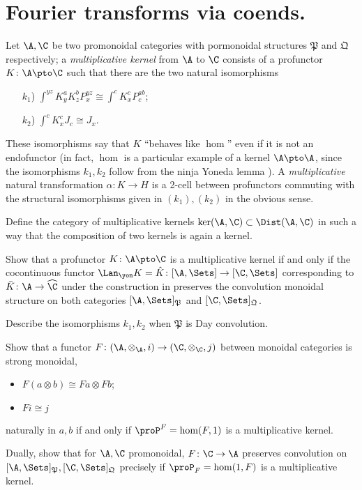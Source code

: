 \section{Fourier transforms via coends.}
\begin{definition}
Let $\A ,\C$ be two promonoidal categories with pormonoidal structures $\mathfrak{P}$ and $\mathfrak{Q}$ respectively; a \emph{multiplicative kernel} from $\A$ to $\C$ consists of a profunctor $K\colon \A\pto \C$ such that there are the two natural isomorphisms
\begin{itemize}
\item[$k_1$)] $\int^{yz}K^a_y K^b_z P^{yz}_x\cong \int^c K^c_x P^{ab}_c$;
\item[$k_2$)] $\int^c K^c_x J_c\cong J_x$.
\end{itemize}
These isomorphisms say that $K$ ``behaves like $\hom$'' even if it is not an endofunctor (in fact, $\hom$ is a particular example of a kernel $\A\pto \A$, since the isomorphisms $k_1, k_2$ follow from the ninja Yoneda lemma ).
A \emph{multiplicative} natural transformation $\alpha\colon K\to H$ is a 2-cell between profunctors commuting with the structural isomorphisms given in $(k_1), (k_2)$ in the obvious sense.
\end{definition}
\begin{exercise}
Define the category of multiplicative kernels $\ker(\A,\C)\subset \Dist(\A,\C)$ in such a way that the composition of two kernels is again a kernel.
\end{exercise}
\begin{exercise}
Show that a profunctor $K\colon \A\pto \C$ is a multiplicative kernel if and only if the cocontinuous functor $\Lan_\yon K=\hat K \colon [\A, \Sets]\to [\C, \Sets]$ corresponding to $\bar K\colon \A \to \widehat{\C}$ under the construction in  preserves the convolution monoidal structure on both categories $[\A, \Sets]_{\mathfrak P}$ and $ [\C, \Sets]_{\mathfrak Q}$. 

Describe the isomorphisms $k_1, k_2$ when $\mathfrak P$ is Day convolution.
\end{exercise}
\begin{exercise}
Show that a functor $F\colon (\A,\otimes_{\A}, i) \to (\C,\otimes_\C, j)$ between monoidal categories is strong monoidal, \ie
\begin{itemize}
\item $F(a\otimes b)\cong Fa\otimes Fb$;
\item $Fi\cong j$
\end{itemize}
naturally in $a,b$ if and only if $\proP^F=\hom(F,1)$ is a multiplicative kernel.

Dually, show that for $\A,\C$ promonoidal, $F\colon \C\to \A$ preserves convolution on $[\A, \Sets]_{\mathfrak P}, [\C, \Sets]_{\mathfrak Q}$ precisely if $\proP_F=\hom(1, F)$ is a multiplicative kernel.
\end{exercise}
